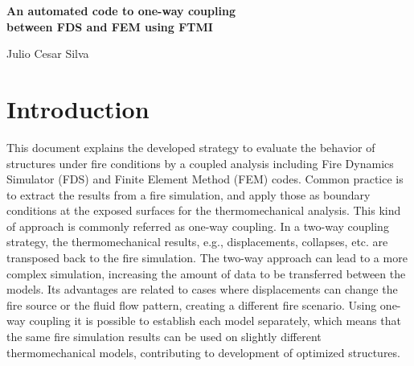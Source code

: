 \documentclass[11pt]{book}
\begin{document}

\pagestyle{empty}

\begin{minipage}[t][9in][s]{6.5in}

\begin{flushright}
\fontsize{20}{24}\selectfont
\bf{
An automated code to one-way coupling \\
between FDS and FEM using FTMI \\
}
\end{flushright}
\begin{flushright}
\fontsize{14}{16}\selectfont
{
Julio Cesar Silva  
}

\end{flushright}


\end{minipage}

\newpage

\newpage

\frontmatter

\pagestyle{plain}

\cleardoublepage
{}
\tableofcontents

\mainmatter


\chapter{Introduction}
\label{info:intro}

This document explains the developed strategy to evaluate the behavior of structures under fire conditions by a coupled analysis including Fire Dynamics Simulator (FDS\cite{FDS_Users_Guide}) and Finite Element Method (FEM) codes. Common practice is to extract the results from a fire simulation, and apply those as boundary conditions at the exposed surfaces for the thermomechanical analysis. This kind of approach is commonly referred as one-way coupling. In a two-way coupling strategy, the thermomechanical results, e.g., displacements, collapses, etc. are transposed back to the fire simulation. The two-way approach can lead to a more complex simulation, increasing the amount of data to be transferred between the models. Its advantages are related to cases where displacements can change the fire source or the fluid flow pattern, creating a different fire scenario. Using one-way coupling it is possible to establish each model separately, which means that the same fire simulation results can be used on slightly different thermomechanical models, contributing to development of optimized structures.  
\end{document}

